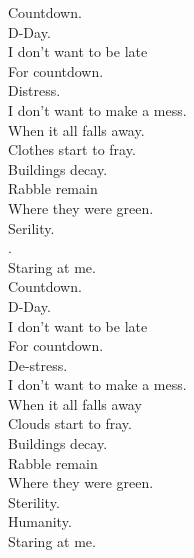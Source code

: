 
\label{album:sketches-of-brunswick-east}








Countdown. \\
D-Day. \\
I don't want to be late \\
For countdown. \\
Distress. \\
I don't want to make a mess. \\

When it all falls away. \\
Clothes start to fray. \\
Buildings decay. \\
Rabble remain \\
Where they were green. \\
Serility. \\
. \\
Staring at me. \\

Countdown. \\
D-Day. \\
I don't want to be late \\
For countdown. \\
De-stress. \\
I don't want to make a mess. \\

When it all falls away \\
Clouds start to fray. \\
Buildings decay. \\
Rabble remain \\
Where they were green. \\
Sterility. \\
Humanity. \\
Staring at me. \\

